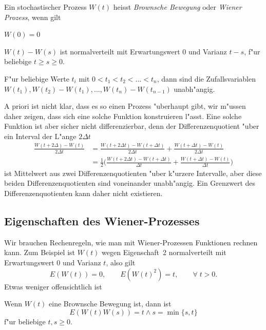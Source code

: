 \begin{definition}
Ein stochastischer Prozess $W(t)$ heisst {\em Brownsche Bewegung} oder
{\em Wiener Prozess}, wenn gilt
\begin{compactenum}
\item $W(0)=0$
\item $W(t)-W(s)$ ist normalverteilt mit Erwartungswert $0$ und
Varianz $t-s$, f"ur beliebige $t\ge s\ge 0$.
\item F"ur beliebige Werte $t_i$ mit $0<t_1<t_2<\dots<t_n$, dann sind
die Zufallsvariablen
$W(t_1), W(t_2)-W(t_1),\dots,W(t_n)-W(t_{n-1})$ unabh"angig.
\end{compactenum}
\end{definition}

A priori ist nicht klar, dass es so einen Prozess "uberhaupt gibt, wir
m"ussen daher zeigen, dass sich eine solche Funktion konstruieren l"asst.
Eine solche Funktion ist aber sicher nicht differenzierbar, denn
der Differenzenquotient "uber ein Interval der L"ange $2\Delta t$
\begin{align*}
\frac{W(t+2\Delta)-W(t)}{2\Delta t}
&=
\frac{W(t+2\Delta t)-W(t+\Delta t)}{2\Delta t}
+
\frac{W(t+\Delta t)-W(t)}{2\Delta t}
\\
&=
\frac12\biggl(
\frac{W(t+2\Delta t)-W(t+\Delta t)}{\Delta t}
+
\frac{W(t+\Delta t)-W(t)}{\Delta t}
\biggr)
\end{align*}
ist Mittelwert aus zwei Differenzenquotienten "uber k"urzere Intervalle,
aber diese beiden Differenzenquotienten sind voneinander unabh"angig.
Ein Grenzwert des Differenzenquotienten kann daher nicht existieren.

\subsection{Eigenschaften des Wiener-Prozesses}
Wir brauchen Rechenregeln, wie man mit Wiener-Prozessen Funktionen
rechnen kann.
Zum Beispiel ist $W(t)$ wegen Eigenschaft~2 normalverteilt mit Erwartungswert
$0$ und Varianz $t$, also gilt
\[
E(W(t))=0,\qquad E(W(t)^2)=t,\qquad \forall\;t>0.
\]
Etwas weniger offensichtlich ist
\begin{hilfssatz}
Wenn $W(t)$ eine Brownsche Bewegung ist, dann ist
\[
E(W(t)W(s)) = t\wedge s = \min\{s,t\}
\]
f"ur beliebige $t,s\ge 0$.
\end{hilfssatz}

